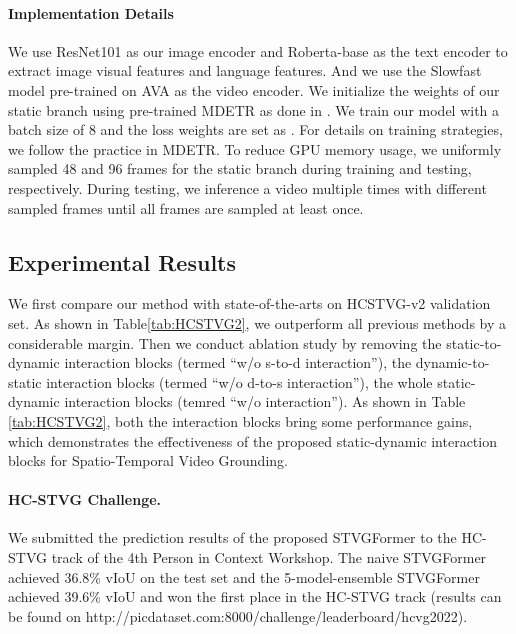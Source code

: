 \documentclass[sigconf]{acmart}
\begin{document}
\paragraph{Implementation Details}
We use ResNet101\cite{resnet} as our image encoder and Roberta-base\cite{roberta} as the text encoder to extract image visual features and language features. And we use the Slowfast\cite{slowfast} model pre-trained on AVA\cite{ava} as the video encoder. We initialize the weights of our static branch using pre-trained MDETR\cite{mdetr} as done in \cite{Aug2dTAN, TubeDETR}. We train our model with a batch size of 8 and the loss weights are set as . For details on training strategies, we follow the practice in MDETR\cite{mdetr}. To reduce GPU memory usage, we uniformly sampled 48 and 96 frames for the static branch during training and testing, respectively. During testing, we inference a video multiple times with different sampled frames until all frames are sampled at least once.

\subsection{Experimental Results}
We first compare our method with state-of-the-arts on HCSTVG-v2 validation set\cite{HCSTVG_paper}. As shown in Table\ref{tab:HCSTVG2}, we outperform all previous methods by a considerable margin. Then we conduct ablation study by removing the static-to-dynamic interaction blocks (termed ``w/o s-to-d interaction''), the dynamic-to-static interaction blocks (termed ``w/o d-to-s interaction''), the whole static-dynamic interaction blocks (temred ``w/o interaction''). As shown in Table \ref{tab:HCSTVG2}, both the interaction blocks bring some performance gains, which demonstrates the effectiveness of the proposed static-dynamic interaction blocks for Spatio-Temporal Video Grounding.
\paragraph{HC-STVG Challenge.}
We submitted the prediction results of the proposed STVGFormer to the HC-STVG track of the 4th Person in Context Workshop. The naive STVGFormer achieved 36.8\% vIoU on the test set and the 5-model-ensemble STVGFormer achieved 39.6\% vIoU and won the first place in the HC-STVG track (results can be found on http://picdataset.com:8000/challenge/leaderboard/hcvg2022).
\end{document}
